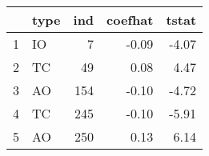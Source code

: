 % 
\begin{tabular}{rlrrr}
  \hline
 & type & ind & coefhat & tstat \\ 
  \hline
1 & IO &   7 & -0.09 & -4.07 \\ 
  2 & TC &  49 & 0.08 & 4.47 \\ 
  3 & AO & 154 & -0.10 & -4.72 \\ 
  4 & TC & 245 & -0.10 & -5.91 \\ 
  5 & AO & 250 & 0.13 & 6.14 \\ 
   \hline
\end{tabular}

